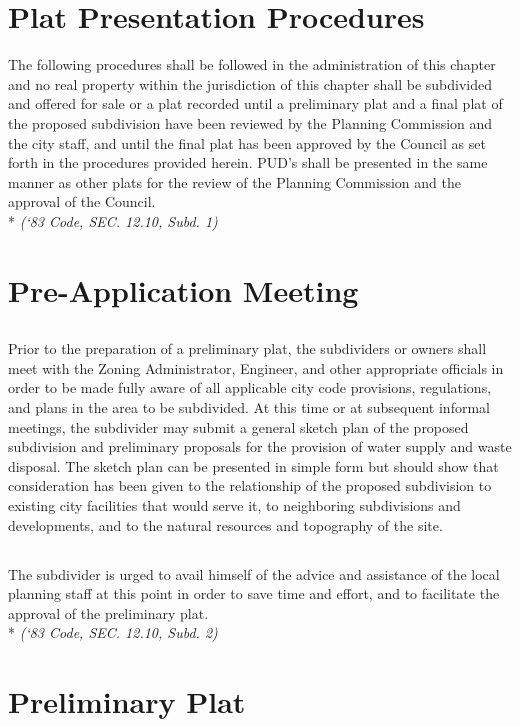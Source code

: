 \section{Plat Presentation Procedures}
The following procedures shall be followed in the administration of this chapter and no real property within the jurisdiction of this chapter shall be subdivided and offered for sale or a plat recorded until a preliminary plat and a final plat of the proposed subdivision have been reviewed by the Planning Commission and the city staff, and until the final plat has been approved by the Council as set forth in the procedures provided herein. PUD’s shall be presented in the same manner as other plats for the review of the Planning Commission and the approval of the Council.\\*
\emph{(‘83 Code, SEC. 12.10, Subd. 1)}
\section{Pre-Application Meeting}
\subsection{}
Prior to the preparation of a preliminary plat, the subdividers or owners shall meet with the Zoning Administrator, Engineer, and other appropriate officials in order to be made fully aware of all applicable city code provisions, regulations, and plans in the area to be subdivided. At this time or at subsequent informal meetings, the subdivider may submit a general sketch plan of the proposed subdivision and preliminary proposals for the provision of water supply and waste disposal. The sketch plan can be presented in simple form but should show that consideration has been given to the relationship of the proposed subdivision to existing city facilities that would serve it, to neighboring subdivisions and developments, and to the natural resources and topography of the site.
\subsection{}
 The subdivider is urged to avail himself of the advice and assistance of the local planning staff at this point in order to save time and effort, and to facilitate the approval of the preliminary plat.\\*
 \emph{(‘83 Code, SEC. 12.10, Subd. 2)}
\section{Preliminary Plat}
